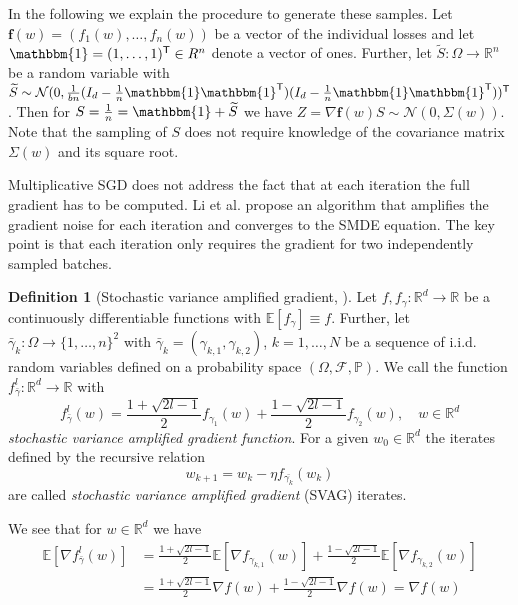 \documentclass[12pt]{article}
\theoremstyle{definition}
\newtheorem{definition}[definition]{Definition}
\numberwithin{equation}{section}
\newcommand{\R}{\mathbb{R}}
\newcommand{\BP}{\mathbb{P}}
\newcommand{\CF}{\mathcal{F}}
\newcommand{\CN}{\mathcal{N}}
\newcommand{\T}{\mathsf{T}}
\newcommand{\ev}[1]{\mathbb{E}\left[{#1}\right]}
\begin{document}
In the following we explain the procedure to generate these samples.
Let $\pmb{f}(w) = (f_1(w), \dots, f_n(w))$ be a vector of the individual losses and let $\mathbbm{1} = (1, \dots, 1)^\T \in R^n$ denote a vector of ones. Further, let $\widetilde{S} : \Omega \rightarrow \R^n$ be a random variable  with $\widetilde{S} \sim \CN(0, \frac{1}{bn}(I_d - \frac{1}{n}\mathbbm{1}\mathbbm{1}^\T )(I_d - \frac{1}{n}\mathbbm{1}\mathbbm{1}^\T))^\T$. Then for $S = \frac{1}{n} = \mathbbm{1} + \widetilde{S}$ we have $Z = \nabla \pmb{f}(w)S \sim \CN(0, \Sigma(w))$.
Note that the sampling of $S$ does not require knowledge of the covariance matrix $\Sigma(w)$ and its square root.

Multiplicative SGD does not address the fact that at each iteration the full gradient has to be computed. Li et al. \cite{liValidityModelingSGD2021} propose an algorithm that amplifies the gradient noise for each iteration and converges to the SMDE equation. The key point is that each iteration only requires the gradient for two independently sampled batches. 
\begin{definition}[Stochastic variance amplified gradient, \cite{liValidityModelingSGD2021}]
  Let $f, f_{\gamma} : \R^d \rightarrow \R$ be a continuously differentiable functions with $\ev{f_{\gamma}} \equiv f$. Further, let $\bar{\gamma}_k : \Omega \rightarrow \{1,\dots,n\}^2 $ with $\bar{\gamma}_k =(\gamma_{k,1}, \gamma_{k,2})$, $k=1,\dots,N$ be a sequence of i.i.d. random variables defined on a probability space $(\Omega, \CF, \BP)$. We call the function $f^l_{\bar{\gamma}} : \R^d \rightarrow \R$ with
  \begin{equation*}
    f^l_{\bar{\gamma}}(w) =  \frac{1+\sqrt{2l - 1}}{2}f_{\gamma_{1}}(w) + \frac{1-\sqrt{2l - 1}}{2}f_{\gamma_{2}}(w), \quad w \in \R^d
  \end{equation*}
  \emph{stochastic variance amplified gradient function}.
    For a given $w_{0} \in \R^d$ the iterates defined by the recursive relation
  \begin{equation*}
    w_{k+1} = w_{k} - \eta f_{\bar{\gamma_k}}(w_{k})
  \end{equation*}
  are called \emph{stochastic variance amplified gradient} (SVAG) iterates.
\end{definition}
We see that for $w \in \R^d$ we have
\begin{align*}
  \ev{\nabla f^l_{\bar{\gamma}}(w)} &= \frac{1+\sqrt{2l - 1}}{2}\ev{\nabla f_{\gamma_{k,1}}(w)} + \frac{1-\sqrt{2l - 1}}{2}\ev{\nabla f_{\gamma_{k,2}}(w)} \\
  &= \frac{1+\sqrt{2l - 1}}{2}\nabla f(w) + \frac{1-\sqrt{2l - 1}}{2} \nabla f(w) = \nabla f(w)
\end{align*}
\end{document}
